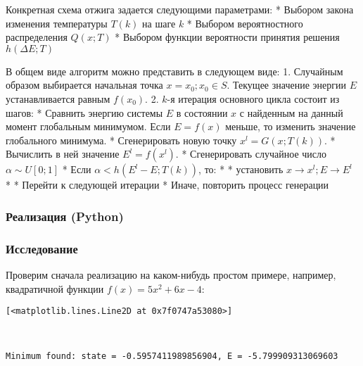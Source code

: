 \documentclass{article}
\begin{document}
    Конкретная схема отжига задается следующими параметрами: * Выбором
закона изменения температуры \(T(k)\) на шаге \(k\) * Выбором
вероятностного распределения \(Q(x; T)\) * Выбором функции вероятности
принятия решения \(h(\Delta E; T)\)

    В общем виде алгоритм можно представить в следующем виде: 1. Случайным
образом выбирается начальная точка \(x = x_0; x_0 \in S\). Текущее
значение энергии \(E\) устанавливается равным \(f(x_0)\). 2. \(k\)-я
итерация основного цикла состоит из шагов: * Сравнить энергию системы
\(E\) в состоянии \(x\) с найденным на данный момент глобальным
минимумом. Если \(E = f(x)\) меньше, то изменить значение глобального
минимума. * Сгенерировать новую точку \(x^l = G(x; T(k))\). * Вычислить
в ней значение \(E^l = f(x^l)\). * Сгенерировать случайное число
\(\alpha \sim U[0;1]\) * Если \(\alpha < h(E^l - E; T(k))\), то: * *
установить \(x \longrightarrow x^l; E \longrightarrow E^l\) * * Перейти
к следующей итерации * Иначе, повторить процесс генерации

    \subsubsection{Реализация
(Python)}\label{ux440ux435ux430ux43bux438ux437ux430ux446ux438ux44f-python}

    \subsubsection{Исследование}\label{ux438ux441ux441ux43bux435ux434ux43eux432ux430ux43dux438ux435}

    Проверим сначала реализацию на каком-нибудь простом примере, например,
квадратичной функции \(f(x) = 5x^2 + 6x - 4\):

    
    
    \begin{verbatim}
[<matplotlib.lines.Line2D at 0x7f0747a53080>]
    \end{verbatim}

    

    \begin{center}
    \end{center}
    { \hspace*{\fill} \\}
    
    \begin{Verbatim}[commandchars=\\\{\}]
Minimum found: state = -0.5957411989856904, E = -5.799909313069603

    \end{Verbatim}
\end{document}
